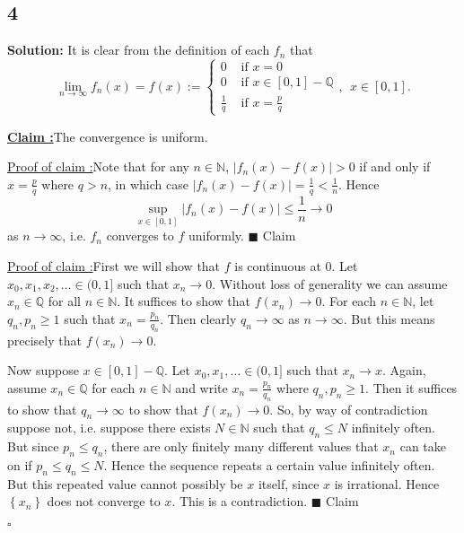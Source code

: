 \documentclass[12pt]{article}
\newcounter{ProofCounter}
\newcounter{ClaimCounter}[ProofCounter]
\newenvironment{Solution}{\stepcounter{ProofCounter}\textbf{Solution:}}{\hfill$\square$}
\newenvironment{claim}[1]{\vspace{1mm}\stepcounter{ClaimCounter}\par\noindent\underline{\bf Claim \theClaimCounter:}\space#1}{}
\newenvironment{claimproof}[1]{\par\noindent\underline{Proof of claim \theClaimCounter:}\space#1}{\hfill $\blacksquare$ Claim \theClaimCounter}
\begin{document}
\subsection*{4}
\begin{Solution}
  It is clear from the definition of each $f_{n}$ that 
  \[
    \lim_{n\rightarrow\infty} f_{n}(x) = f(x) := \left\{ \begin{array}{cl}
        0 & \text{ if } x = 0 \\
        0 & \text{ if } x \in [0,1] - \mathbb{Q} \\
        \frac{1}{q} & \text{ if } x = \frac{p}{q}
    \end{array} \right.,\ \  x \in [0,1].
  \]
  \begin{claim}
    The convergence is uniform.
  \end{claim}
  \begin{claimproof}
    Note that for any $n \in \mathbb{N}$, $|f_n(x) - f(x)| > 0$ if and only if $x = \frac{p}{q}$ where $q > n$, in which case $|f_n(x) - f(x)| =
    \frac{1}{q} < \frac{1}{n}$.
    Hence
    \[
      \sup_{x\in[0,1]}|f_n(x) - f(x)| \leq \frac{1}{n} \rightarrow 0
    \]
    as $n\rightarrow\infty$, i.e. $f_{n}$ converges to $f$ uniformly.
  \end{claimproof}

  \begin{claimproof}
    First we will show that $f$ is continuous at 0. Let $x_0, x_1, x_2, \dots \in (0,1]$ such that $x_n \rightarrow 0$. 
    Without loss of generality we can assume $x_n \in \mathbb{Q}$ for all $n \in \mathbb{N}$.
    It suffices to
    show that $f(x_n) \rightarrow 0$. For each $n \in \mathbb{N}$, let $q_n, p_{n} \geq 1$ such that $x_n = \frac{p_n}{q_n}$. Then clearly $q_n \rightarrow
    \infty$ as $n \rightarrow \infty$. But this means precisely that $f(x_n) \rightarrow 0$.

    Now suppose $x \in [0,1] - \mathbb{Q}$. Let $x_0, x_1, \dots \in (0,1]$ such that $x_n \rightarrow x$. Again, assume $x_n \in \mathbb{Q}$ for each
    $n \in \mathbb{N}$ and write $x_n = \frac{p_n}{q_n}$ where $q_n, p_n \geq 1$. Then it suffices to show that $q_n \rightarrow \infty$ to show that
    $f(x_n) \rightarrow 0$. So, by way
    of contradiction suppose not, i.e. suppose there exists $N \in \mathbb{N}$ such that $q_n \leq N$ infinitely often. But since $p_n \leq q_n$,
    there are only finitely many different values that $x_n$ can take on if $p_n \leq q_n \leq N$. Hence the sequence repeats a certain value infinitely
    often. But this repeated value cannot possibly be $x$ itself, since $x$ is irrational. Hence $\left\{ x_n \right\}$ does not converge to $x$. This
    is a contradiction.
  \end{claimproof}

\end{Solution}
\end{document}
